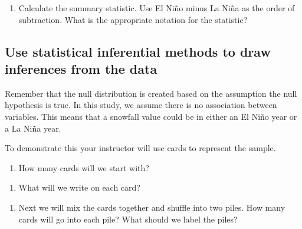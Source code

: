 \documentclass[
]{report}
\providecommand{\tightlist}{%
  \setlength{\itemsep}{0pt}\setlength{\parskip}{0pt}}
\begin{document}
\begin{enumerate}
\def\labelenumi{\arabic{enumi}.}
\setcounter{enumi}{8}
\tightlist
\item
  Calculate the summary statistic. Use El Ni\~{n}o minus La Ni\~{n}a as the order of subtraction. What is the appropriate notation for the statistic?
\end{enumerate}

\vspace{0.5in}

\newpage

\hypertarget{use-statistical-inferential-methods-to-draw-inferences-from-the-data}{%
\subsection*{Use statistical inferential methods to draw inferences from the data}\label{use-statistical-inferential-methods-to-draw-inferences-from-the-data}}

Remember that the null distribution is created based on the assumption the null hypothesis is true. In this study, we assume there is no association between variables. This means that a snowfall value could be in either an El Ni\~{n}o year or a La Ni\~{n}a year.

To demonstrate this your instructor will use cards to represent the sample.

\begin{enumerate}
\def\labelenumi{\arabic{enumi}.}
\setcounter{enumi}{9}
\tightlist
\item
  How many cards will we start with?
\end{enumerate}

\vspace{0.5in}

\begin{enumerate}
\def\labelenumi{\arabic{enumi}.}
\setcounter{enumi}{10}
\tightlist
\item
  What will we write on each card?
\end{enumerate}

\vspace{0.5in}

\begin{enumerate}
\def\labelenumi{\arabic{enumi}.}
\setcounter{enumi}{11}
\tightlist
\item
  Next we will mix the cards together and shuffle into two piles. How many cards will go into each pile? What should we label the piles?
\end{enumerate}
\end{document}
